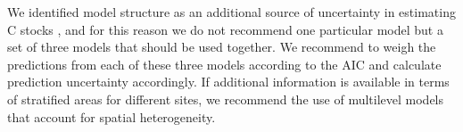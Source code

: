 \documentclass[review, authoryear]{elsarticle}   	%
\begin{document}
We identified model structure as an additional source of uncertainty in estimating C stocks \citep[cf][]{IPCC2006}, and for this reason we do  not recommend one particular model but a set of three models that should be used together. We recommend to weigh the predictions from each of these three models according to the AIC and calculate prediction uncertainty accordingly. If additional information is available in terms of stratified areas for different sites, we recommend the use of multilevel models that account for spatial heterogeneity. 

%
%
%
\end{document}
